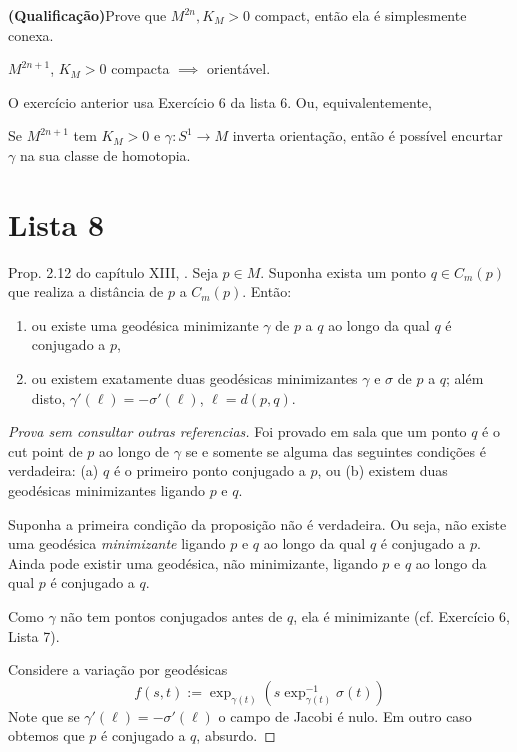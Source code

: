 \begin{exercise}
{\bf (Qualificação)}Prove que $M^{2n},K_M>0$ compact, então ela é simplesmente conexa.
\end{exercise}

\begin{exercise}
$M^{2n+1}$, $K_M>0$ compacta \(\implies\) orientável.
\end{exercise}

O exercício anterior usa Exercício 6 da lista 6. Ou, equivalentemente,

\begin{exercise}
Se $M^{2n+1}$ tem $K_M >0$ e $\gamma:S^1 \to M$ inverta orientação, então é
possível encurtar $\gamma$ na sua classe de homotopia.
\end{exercise}

\begin{exercise}

\end{exercise}

\section{Lista 8}
\label{section-l8}

\begin{exercise}
Prop. 2.12 do capítulo XIII, \cite{doc}. Seja $p \in M$. 
Suponha exista um ponto $q \in C_m(p)$ que realiza a distância de $p$ a 
$C_m(p)$. Então:
\begin{enumerate}
\item ou existe uma geodésica 
minimizante $\gamma$ de $p$ a $q$ ao longo da qual $q$ é 
conjugado a $p$,
\item ou existem exatamente duas geodésicas 
minimizantes $\gamma$ e $\sigma$ de $p$ a $q$; além disto,
$\gamma'(\ell)=-\sigma'(\ell)$, 
$\ell=d(p,q)$. 
\end{enumerate}
\end{exercise}

\begin{proof}[Prova sem consultar outras referencias]
Foi provado em sala que um ponto $q$ é o cut point de $p$ ao longo 
de $\gamma$ se e somente se
alguma das seguintes condições é verdadeira: (a) $q$ é o primeiro ponto
conjugado a $p$, ou (b) existem duas geodésicas minimizantes ligando $p$ e $q$.

Suponha a primeira condição da proposição não é verdadeira. 
Ou seja, não existe uma geodésica {\it minimizante} ligando $p$ e $q$ ao longo
da qual $q$ é conjugado a $p$. Ainda pode existir uma geodésica, não
minimizante, ligando $p$ e $q$ ao longo da qual $p$ é conjugado a $q$.

Como $\gamma$ não tem pontos conjugados antes
de $q$, ela é minimizante (cf. Exercício 6, Lista 7).

Considere a variação por geodésicas 
$$
f(s,t):=\operatorname{exp}_{\gamma(t)}
(s\operatorname{exp}_{\gamma(t)}^{-1}\sigma(t))
$$
Note que se $\gamma'(\ell)=-\sigma'(\ell)$ o campo de Jacobi é nulo. Em outro
caso obtemos que $p$ é conjugado a $q$, absurdo.
\end{proof}

